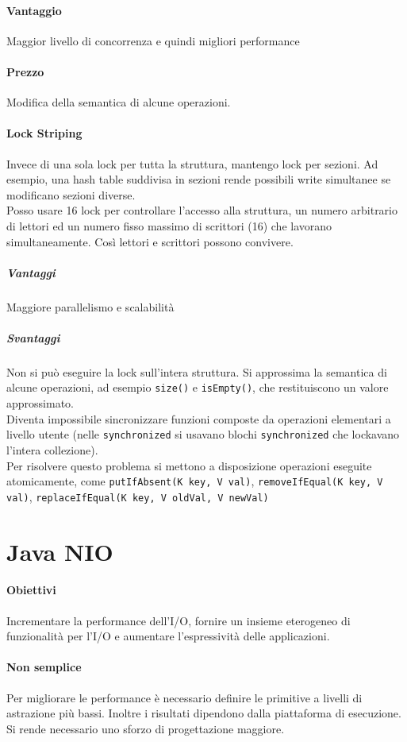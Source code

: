 \documentclass[10pt]{article}
\begin{document}
\paragraph{Vantaggio} Maggior livello di concorrenza e quindi migliori performance
\paragraph{Prezzo} Modifica della semantica di alcune operazioni.
\paragraph{Lock Striping} Invece di una sola lock per tutta la struttura, mantengo lock per sezioni. Ad esempio, una hash table suddivisa in sezioni rende possibili write simultanee se modificano sezioni diverse.\\
Posso usare 16 lock per controllare l'accesso alla struttura, un numero arbitrario di lettori ed un numero fisso massimo di scrittori (16) che lavorano simultaneamente. Così lettori e scrittori possono convivere.
\subparagraph{Vantaggi} Maggiore parallelismo e scalabilità
\subparagraph{Svantaggi} Non si può eseguire la lock sull'intera struttura. Si approssima la semantica di alcune operazioni, ad esempio \texttt{size()} e \texttt{isEmpty()}, che restituiscono un valore approssimato.\\
Diventa impossibile sincronizzare funzioni composte da operazioni elementari a livello utente (nelle \texttt{synchronized} si usavano blochi \texttt{synchronized} che lockavano l'intera collezione).\\
Per risolvere questo problema si mettono a disposizione operazioni eseguite atomicamente, come \texttt{putIfAbsent(K key, V val)}, \texttt{removeIfEqual(K key, V val)}, \texttt{replaceIfEqual(K key, V oldVal, V newVal)}
\section{Java NIO}
\paragraph{Obiettivi} Incrementare la performance dell'I/O, fornire un insieme eterogeneo di funzionalità per l'I/O e aumentare l'espressività delle applicazioni.
\paragraph{Non semplice} Per migliorare le performance è necessario definire le primitive a livelli di astrazione più bassi. Inoltre i risultati dipendono dalla piattaforma di esecuzione. Si rende necessario uno sforzo di progettazione maggiore.
\end{document}
